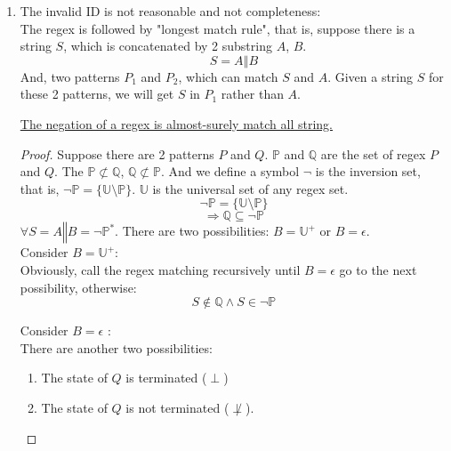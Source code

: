 \documentclass[12pt,a4paper]{article}
\newenvironment{claim}[1]{\par\noindent{Claim:}\space#1}{}
\begin{document}
\begin{CJK}{UTF8}{bsmi}
\begin{enumerate}
        \item The invalid ID is not reasonable and not completeness:\\
              The regex is followed by "longest match rule", that is, suppose there is a string $S$,
              which is concatenated by 2 substring $A$, $B$.  $$S = A \mathbin\Vert B$$
              And, two patterns $P_1$ and $P_2$, which can match $S$ and $A$. Given a
              string $S$ for these 2 patterns, we will get $S$ in $P_1$ rather than $A$.\\
              \begin{claim}
                  \underline{The negation of a regex is almost-surely match all string.}
              \end{claim}
              \begin{proof}
                  Suppose there are 2 patterns $P$ and $Q$. $\mathbb{P}$ and $\mathbb{Q}$ are the
                  set of regex $P$ and $Q$. The $\mathbb{P} \not\subset \mathbb{Q}$,
                  $\mathbb{Q} \not\subset \mathbb{P}$.
                  And we define a symbol $\neg$ is the inversion set, that is, $\neg \mathbb{P} = \{\mathbb{U}
                      \setminus \mathbb{P}\}$. $\mathbb{U}$ is the universal set of any regex set.\\
                  $$\neg \mathbb{P} = \{\mathbb{U} \setminus \mathbb{P}\}$$
                  $$\Rightarrow \mathbb{Q} \subseteq \neg \mathbb{P}$$
                  $\forall S = A \mathbin\Vert B = {\neg \mathbb{P}}^*$. There are two possibilities:
                  $B = \mathbb{U}^+$ or $B = \epsilon$.\\
                  Consider $B = \mathbb{U}^+$:\\
                  Obviously, call the regex matching recursively until $B = \epsilon$ go to the next possibility, otherwise:
                  \begin{equation}
                      S \not\in \mathbb{Q} \land S \in \neg\mathbb{P}
                  \end{equation}

                  Consider $B = \epsilon$ :\\
                  There are another two possibilities:
                  \begin{enumerate}
                      \item The state of $Q$ is terminated ($\perp$)
                      \item The state of $Q$ is not terminated ($\not\perp$).
                  \end{enumerate}


\end{proof}
\end{enumerate}
\end{CJK}
\end{document}
